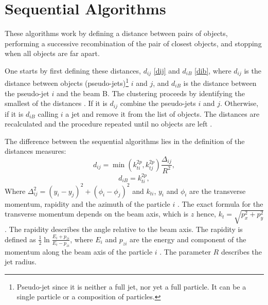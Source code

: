 \section{Sequential Algorithms}

These algorithms work by defining a distance between pairs of objects, performing a successive recombination of the pair of closest objects, and stopping when all objects are far apart.

One starts by first defining these distances, $d_{ij}$ \eqref{dij} and $d_{iB}$ \eqref{dib}, where $d_{ij}$ is the distance between objects (pseudo-jets)\footnote{Pseudo-jet since it is neither a full jet, nor yet a full particle. It can be a single particle or a composition of particles.}
$i$ and $j$, and $d_{iB}$ is the distance between the pseudo-jet $i$ and the beam B. The clustering proceeds by identifying the smallest of the distances . If it is $d_{ij}$ combine the pseudo-jets $i$ and $j$. Otherwise, if it is $d_{iB}$ calling $i$ a jet and remove it from the list of objects. The distances are recalculated and the procedure repeated until no objects are left \citep{Cacciari:2008gp}. 

The difference between the sequential algorithms lies in the definition of the distances measures:
\begin{equation}
d_{ij} = \min(k_{ti}^{2p}, k_{tj}^{2p}) \frac{\Delta_{ij}}{R^{2}},
\label{dij}\end{equation}         
\begin{equation}
d_{iB} = k_{ti}^{2p} ,
\label{dib}\end{equation}
Where $\Delta_{ij}^{2} = (y_{i} - y_{j})^2 + (\phi_{i} - \phi_{j})^2$ and $k_{ti}$, $y_{i}$ and $\phi_{i}$ are the transverse momentum, rapidity and  the azimuth of the particle $i$ \citep{Cacciari:2008gp}. The exact formula for the transverse momentum depends on the beam axis, which is $z$ hence, $k_{t} = \sqrt{p_x^2 + p_y^2}$. The rapidity describes the angle relative to the beam axis.
The rapidity is defined as $\frac{1}{2} \ln \frac{E_i + p_{zi}}{E_i - p_{zi}}$, where  $E_i$ and $p_{zi}$ are the energy and component of the momentum along the beam axis of the particle $i$ \citep{Cacciari:2011ma}. The parameter $R$ describes the jet radius. 

